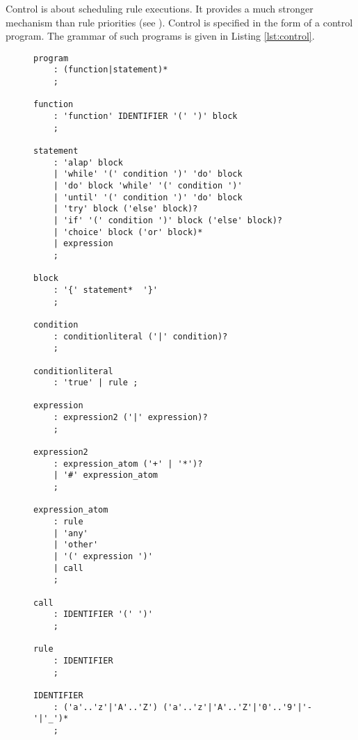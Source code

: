 Control is about scheduling rule executions. It provides a much stronger
mechanism than rule priorities (see ).  Control is
specified in the form of a control program. The grammar of such programs is
given in Listing \ref{lst:control}.

\lstset{
	basicstyle=\ttfamily\scriptsize
}

\begin{figure}
\begin{lstlisting}[label=lst:control,caption={Grammar of Control Programs}]
program
	: (function|statement)*
	;

function
	: 'function' IDENTIFIER '(' ')' block
	;

statement 
	: 'alap' block
	| 'while' '(' condition ')' 'do' block
	| 'do' block 'while' '(' condition ')'
	| 'until' '(' condition ')' 'do' block
	| 'try' block ('else' block)?
	| 'if' '(' condition ')' block ('else' block)?
	| 'choice' block ('or' block)*
	| expression
	;

block
	: '{' statement*  '}'
	;

condition
	: conditionliteral ('|' condition)?
	;

conditionliteral
	: 'true' | rule ;

expression	
	: expression2 ('|' expression)?
	;

expression2
    : expression_atom ('+' | '*')?
    | '#' expression_atom
    ;

expression_atom
	: rule
	| 'any'
	| 'other'
	| '(' expression ')'
	| call
	; 

call
	: IDENTIFIER '(' ')'
	;

rule
	: IDENTIFIER
	;

IDENTIFIER
	: ('a'..'z'|'A'..'Z') ('a'..'z'|'A'..'Z'|'0'..'9'|'-'|'_')*
	;
\end{lstlisting}
\end{figure}

